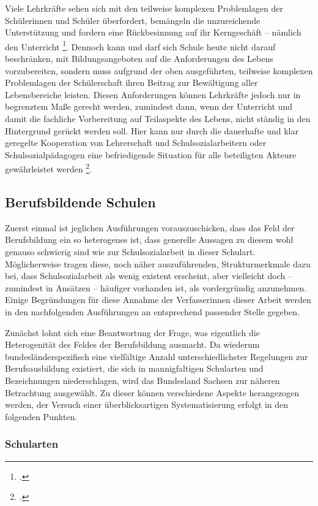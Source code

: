 Viele Lehrkräfte sehen sich mit den teilweise komplexen Problemlagen der Schülerinnen und Schüler überfordert, bemängeln die unzureichende Unterstützung und fordern eine Rückbesinnung auf ihr Kerngeschäft -- nämlich den Unterricht \footcite[vgl.][10]{Drilling2009}. Dennoch kann und darf sich Schule heute nicht darauf beschränken, mit Bildungsangeboten auf die Anforderungen des Lebens vorzubereiten, sondern muss aufgrund der oben ausgeführten, teilweise komplexen Problemlagen der Schülerschaft ihren Beitrag zur Bewältigung aller Lebensbereiche leisten. Diesen Anforderungen können Lehrkräfte jedoch nur in begrenztem Maße gerecht werden, zumindest dann, wenn der Unterricht und damit die fachliche Vorbereitung auf Teilaspekte des Lebens, nicht ständig in den Hintergrund gerückt werden soll. Hier kann nur durch die dauerhafte und klar geregelte Kooperation von Lehrerschaft und Schulsozialarbeitern oder Schulsozialpädagogen eine befriedigende Situation für alle beteiligten Akteure gewährleistet werden \footcite[vgl.][9ff]{Drilling2009}. 

\subsection{Berufsbildende Schulen}
\label{sec:BerufsbildendeSchulen}

Zuerst einmal ist jeglichen Ausführungen vorauszuschicken, dass das Feld der Berufsbildung ein so heterogenes ist, dass generelle Aussagen zu diesem wohl genauso schwierig sind wie zur Schulsozialarbeit in dieser Schulart. Möglicherweise tragen diese, noch näher auszuführenden, Strukturmerkmale dazu bei, dass Schulsozialarbeit als wenig existent erscheint, aber vielleicht doch -- zumindest in Ansätzen -- häufiger vorhanden ist, als vordergründig anzunehmen. Einige Begründungen für diese Annahme der Verfasserinnen dieser Arbeit werden in den nachfolgenden Ausführungen an entsprechend passender Stelle gegeben. 

Zunächst lohnt sich eine Beantwortung der Frage, was eigentlich die Heterogenität des Feldes der Berufsbildung ausmacht. Da wiederum bundesländerspezifisch eine vielfältige Anzahl unterschiedlichster Regelungen zur Berufsausbildung existiert, die sich in mannigfaltigen Schularten und Bezeichnungen niederschlagen, wird das Bundesland Sachsen zur näheren Betrachtung ausgewählt. Zu dieser können verschiedene Aspekte herangezogen werden, der Versuch einer überblicksartigen Systematisierung erfolgt in den folgenden Punkten.

\subsubsection{Schularten}
\label{sec:Schularten}

